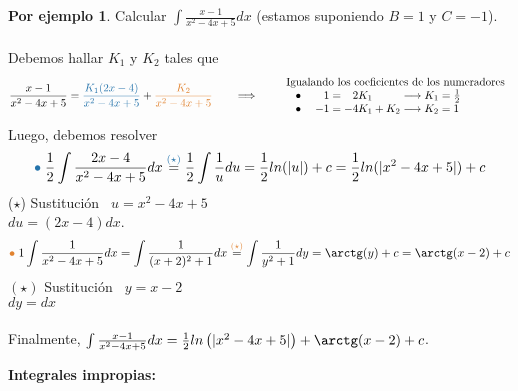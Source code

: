 \documentclass{article}
\theoremstyle{definition}
\newtheorem*{ej}{Por ejemplo}
\theoremstyle{remark}
\newcommand\bl{$\bullet\;$}
\begin{document}
\begin{ej}
Calcular $\int{\frac{x-1}{x^2-4x+5}dx}$  \quad (estamos suponiendo $B=1$ y $C=-1$). \\\\
Debemos hallar $K_1$ y $K_2$ tales que \[
\frac{x-1}{x^2-4x+5}
=
\textcolor{azulp2}{\frac{K_1(2x-4)}{x^2-4x+5}}
+
\textcolor{rojop2}{\frac{K_2}{x^2-4x+5}}
\quad \quad \Longrightarrow \quad \quad \begin{array}{l}
\text{Igualando los coeficientes de los numeradores} \\
\;\;\; $\bl$ \quad \phantom{-}1=\phantom{-}2K_1 \phantom{+k_2+}\longrightarrow K_1=\frac{1}{2} \\
\;\;\; $\bl$ \quad -1=-4K_1+K_2 \longrightarrow K_2=1
\end{array}
\]
Luego, debemos resolver \[
\textcolor{azulp2}{\bullet} \; \frac{1}{2}\int{\frac{2x-4}{x^2-4x+5}dx}
\overset{\textcolor{azulp2}{(\star)}}{=}
\frac{1}{2} \int{\frac{1}{u}du}
=
\frac{1}{2} ln(|u|)+c
=
\frac{1}{2} ln(|x^2-4x+5|)+c
\]
\textcolor{azulp2}{($\star$)} Sustitución $\phantom{d}u=x^2-4x+5$ \\
 $du=(2x-4)dx$.
\[
\textcolor{rojop2}{\bullet} \; 1 \int{\frac{1}{x^2-4x+5}dx}
=
\int{\frac{1}{(x+2)^2+1}dx}
\overset{\textcolor{rojop2}{(\star)}}{=}
\int{\frac{1}{y^2+1}dy}
=
\arctg(y) + c
=
\arctg(x-2)+c
\]
\textcolor{rojop2}{$(\star)$} Sustitución $\phantom{d}y=x-2$ \\
 $dy=dx$
\\\\
Finalmente, $\int{\frac{x-1}{x^2-4x+5}dx}
=
\frac{1}{2}ln\left(|x^2-4x+5|\right)
+
\arctg(x-2)+c$.
\end{ej}

\begin{center}
\textbf{Integrales impropias:}
\end{center}
\end{document}
